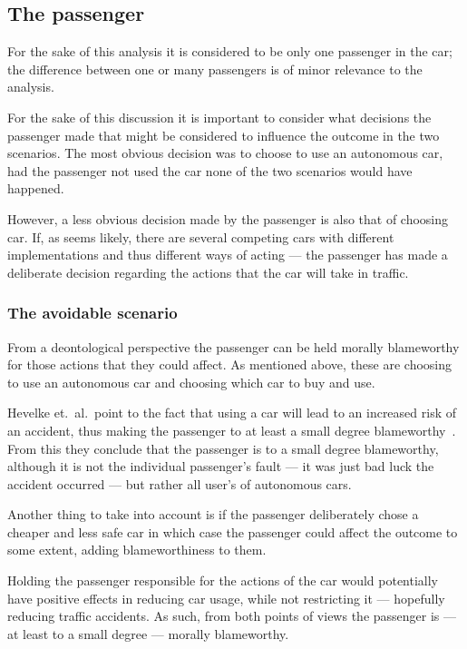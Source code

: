 \subsection{The passenger}
For the sake of this analysis it is considered to be only one passenger in the
car; the difference between one or many passengers is of minor relevance to the
analysis.

For the sake of this discussion it is important to consider what decisions the
passenger made that might be considered to influence the outcome in the two
scenarios. The most obvious decision was to choose to use an autonomous car, had
the passenger not used the car none of the two scenarios would have happened.

However, a less obvious decision made by the passenger is also that of choosing
car. If, as seems likely, there are several competing cars with different
implementations and thus different ways of acting --- the passenger has made a
deliberate decision regarding the actions that the car will take in traffic.

\subsubsection{The avoidable scenario}\label{sec:passenger:avoidable}
From a deontological perspective the passenger can be held morally blameworthy
for those actions that they could affect. As mentioned above, these are choosing
to use an autonomous car and choosing which car to buy and use.

Hevelke et.\ al.\ point to the fact that using a car will lead to an increased
risk of an accident, thus making the passenger to at least a small degree
blameworthy~\cite{hevelke_2014_responsibility_rfcoavaea}. From this they
conclude that the passenger is to a small degree blameworthy, although it is not
the individual passenger's fault --- it was just bad luck the accident occurred
--- but rather all user's of autonomous cars.

Another thing to take into account is if the passenger deliberately chose a
cheaper and less safe car in which case the passenger could affect the outcome
to some extent, adding blameworthiness to them.

Holding the passenger responsible for the actions of the car would potentially
have positive effects in reducing car usage, while not restricting it ---
hopefully reducing traffic accidents. As such, from both points of views
the passenger is --- at least to a small degree --- morally blameworthy.

